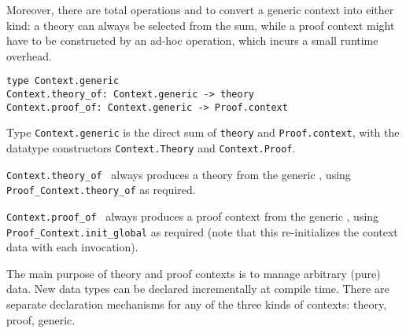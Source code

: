 \begin{isabellebody}
\begin{isamarkuptext}
  Moreover, there are total operations  and  to convert a generic context into either kind: a theory
  can always be selected from the sum, while a proof context might
  have to be constructed by an ad-hoc  operation, which
  incurs a small runtime overhead.%
\end{isamarkuptext}%
\isamarkuptrue%
%
\isadelimmlref
%
\endisadelimmlref
%
\isatagmlref
%
\begin{isamarkuptext}%
\begin{mldecls}
  \verb|type Context.generic| \\
  \verb|Context.theory_of: Context.generic -> theory| \\
  \verb|Context.proof_of: Context.generic -> Proof.context| \\
  \end{mldecls}

  \begin{description}

  \item Type \verb|Context.generic| is the direct sum of \verb|theory| and \verb|Proof.context|, with the datatype
  constructors \verb|Context.Theory| and \verb|Context.Proof|.

  \item \verb|Context.theory_of|~ always produces a
  theory from the generic , using \verb|Proof_Context.theory_of| as required.

  \item \verb|Context.proof_of|~ always produces a
  proof context from the generic , using \verb|Proof_Context.init_global| as required (note that this re-initializes the
  context data with each invocation).

  \end{description}%
\end{isamarkuptext}%
\isamarkuptrue%
%
\endisatagmlref
{\isafoldmlref}%
%
\isadelimmlref
%
\endisadelimmlref
%
\isamarkuptrue%
%
\begin{isamarkuptext}%
The main purpose of theory and proof contexts is to manage
  arbitrary (pure) data.  New data types can be declared incrementally
  at compile time.  There are separate declaration mechanisms for any
  of the three kinds of contexts: theory, proof, generic.


\end{isamarkuptext}
\end{isabellebody}

